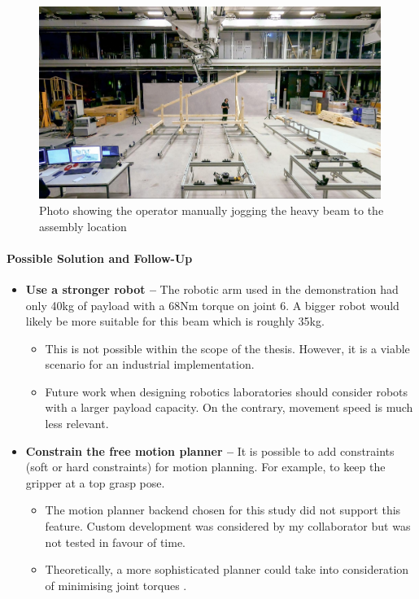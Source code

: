 \begin{figure}[!h]
    \centering
    \includegraphics[width=0.99\textwidth]{images/7b/img79.jpg}
    \caption{Photo showing the operator manually jogging the heavy beam to the assembly location}
    \label{fig:jog-heavy-beam}
\end{figure}

\paragraph{Possible Solution and Follow-Up}

\begin{itemize}
    \item \textbf{Use a stronger robot --} The robotic arm used in the demonstration had only 40kg of payload with a 68Nm torque on joint 6. A bigger robot would likely be more suitable for this beam which is roughly 35kg.
    \begin{itemize}
        \item This is not possible within the scope of the thesis. However, it is a viable scenario for an industrial implementation.
        \item Future work when designing robotics laboratories should consider robots with a larger payload capacity. On the contrary, movement speed is much less relevant.
    \end{itemize}
    \item \textbf{Constrain the free motion planner --} It is possible to add constraints (soft or hard constraints) for motion planning. For example, to keep the gripper at a top grasp pose.
    \begin{itemize}
        \item The motion planner backend chosen for this study did not support this feature. Custom development was considered by my collaborator but was not tested in favour of time.
        \item Theoretically, a more sophisticated planner could take into consideration of minimising joint torques \parencite{gargOptimizationTechniquesApplied2002}.
    \end{itemize}
\end{itemize}

